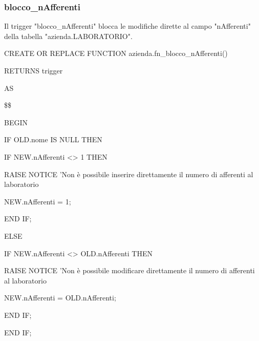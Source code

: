         \subsubsection{blocco\_nAfferenti}
        Il trigger "blocco\_nAfferenti" blocca le modifiche dirette al campo "nAfferenti" della tabella "azienda.LABORATORIO".
        \ttfamily
            \begin{flushleft}
                \begin{description}
                    \item CREATE OR REPLACE FUNCTION azienda.fn\_blocco\_nAfferenti()  
                    \item RETURNS trigger
                    \item AS
                    \item \$\$
                    \item BEGIN 
                    \begin{description}
                        \item IF OLD.nome IS NULL THEN
                        \begin{description}
                            \item IF NEW.nAfferenti <> 1 THEN
                            \begin{description}
                                \item RAISE NOTICE 'Non è possibile inserire direttamente il numero di afferenti al laboratorio %
                                \item NEW.nAfferenti = 1;
                            \end{description}
                            \item END IF;
                        \end{description}
                        
                        \vspace{0.5cm}

                        \item ELSE 
                        \begin{description}
                            \item IF NEW.nAfferenti <> OLD.nAfferenti THEN
                            \begin{description}
                                \item RAISE NOTICE 'Non è possibile modificare direttamente il numero di afferenti al laboratorio %
                                \item NEW.nAfferenti = OLD.nAfferenti;
                            \end{description}
                            \item END IF;
                        \end{description}
                        \item END IF;
                

\end{description}
\end{description}
\end{flushleft}
